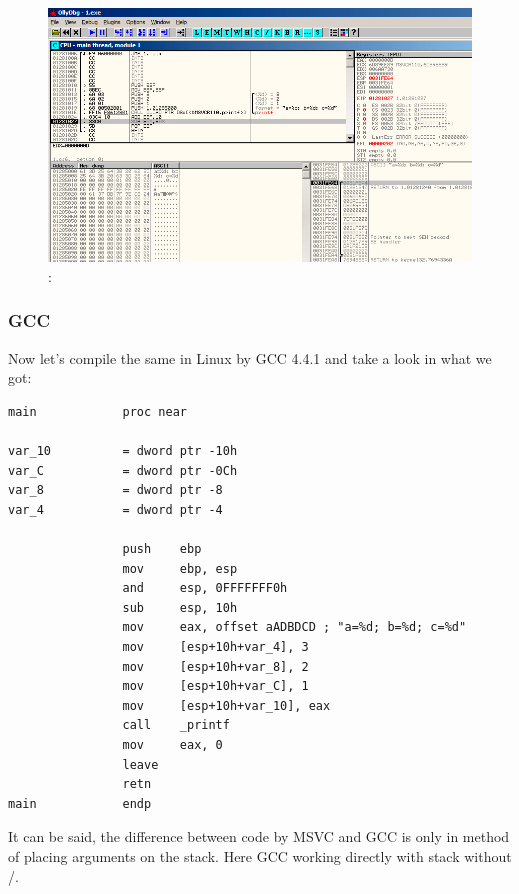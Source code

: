 \begin{figure}[H]
\centering
\includegraphics[scale=0.66]{patterns/03_printf/olly3_4.png}
\caption{\olly:  }
\label{fig:printf3_olly_4}
\end{figure}

\subsubsection{GCC}

{Now let's compile the same in Linux by GCC 4.4.1 and take a look in \IDA what we got:}

\begin{lstlisting}
main            proc near

var_10          = dword ptr -10h
var_C           = dword ptr -0Ch
var_8           = dword ptr -8
var_4           = dword ptr -4

                push    ebp
                mov     ebp, esp
                and     esp, 0FFFFFFF0h
                sub     esp, 10h
                mov     eax, offset aADBDCD ; "a=%d; b=%d; c=%d"
                mov     [esp+10h+var_4], 3
                mov     [esp+10h+var_8], 2
                mov     [esp+10h+var_C], 1
                mov     [esp+10h+var_10], eax
                call    _printf
                mov     eax, 0
                leave
                retn
main            endp
\end{lstlisting}

{It can be said, the difference between code by MSVC and GCC is only in method of placing arguments on the stack.
Here GCC working directly with stack without \PUSH/\POP.}

